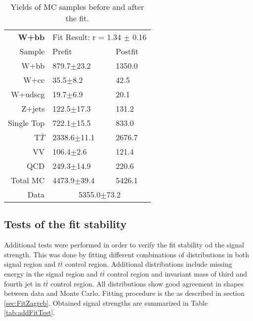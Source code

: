 \begin{table}[!htb]
\begin{center}
   \begin{tabular} {r|l|l} \hline \hline
\bf{W+bb} & \multicolumn{2}{c}{Fit Result: r = 1.34 $\pm$ 0.16}\\
        Sample          & Prefit                & Postfit \\
        \hline
        W+bb            &879.7$\pm$23.2         &1350.0\\
        W+cc            &35.5$\pm$8.2           &42.5\\
        W+udscg         &19.7$\pm$6.9           &20.1\\
        Z+jets          &122.5$\pm$17.3         &131.2\\
        Single Top      &722.1$\pm$15.5         &833.0\\
        T$\bar{T}$      &2338.6$\pm$11.1        &2676.7\\
        VV              &106.4$\pm$2.6          &121.4\\
        QCD             &249.3$\pm$14.9         &220.6\\
        \hline
        Total MC        &4473.9$\pm$39.4        &5426.1\\
        \hline
        Data&\multicolumn{2}{c}{5355.0$\pm$73.2}\\
   \hline\hline
   \end{tabular}
\caption{Yields of MC samples before and after the fit.}
\label{tab:fitYieldsJelena}
\end{center}
\end{table}





\subsection{Tests of the fit stability}

Additional tests were performed in order to verify the fit stability od the signal strength.
This was done by fitting different combinations of distributions in both signal region and $t\bar{t}$ control region.
Additional distributions include missing energy in the signal region and $t\bar{t}$ control region and
invariant mass of third and fourth jet in $t\bar{t}$ control region. All distributions show good agreement
in shapes between data and Monte Carlo. Fitting procedure is the as described in section \ref{sec:FitZagreb}.
Obtained signal strengths are summarized in Table \ref{tab:addFitTest}.

